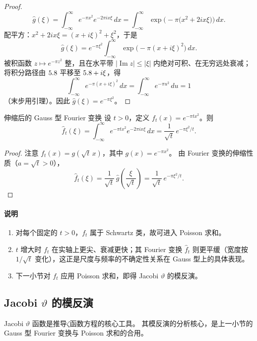\begin{proof}
\[
\hat{g}(\xi)
= \int_{-\infty}^{\infty} e^{-\pi x^2} e^{-2\pi i x\xi}\, dx
= \int_{-\infty}^{\infty} \exp\bigl(-\pi\bigl(x^2 + 2 i x\xi\bigr)\bigr)\, dx.
\]
配平方：$x^2+2ix\xi=(x+i\xi)^2+\xi^2$，于是
\[
\hat{g}(\xi)
= e^{-\pi\xi^2}
\int_{-\infty}^{\infty} \exp\bigl(-\pi (x+i\xi)^2\bigr)\, dx.
\]
被积函数 $z\mapsto e^{-\pi z^2}$ 整，且在水平带 $|\operatorname{Im} z|\le |\xi|$ 内绝对可积、在无穷远处衰减；
将积分路径由 $5.8$ 平移至 $5.8+i\xi$，得
\[
\int_{-\infty}^{\infty} e^{-\pi (x+i\xi)^2}\, dx
= \int_{-\infty}^{\infty} e^{-\pi u^2}\, du = 1
\]
（末步用引理）。因此 $\hat{g}(\xi)=e^{-\pi\xi^2}$。
\end{proof}

\begin{theorem}{伸缩后的 Gauss 型 Fourier 变换}{}\label{thm:gaussian_ft_scaled}
设 $t>0$，定义 $f_t(x)=e^{-\pi t x^2}$。则
\[
\hat{f}_t(\xi)
= \int_{-\infty}^{\infty} e^{-\pi t x^2} e^{-2\pi i x\xi}\, dx
= \frac{1}{\sqrt{t}}\, e^{-\pi \xi^2 / t}.
\]
\end{theorem}

\begin{proof}
注意 $f_t(x)=g(\sqrt{t}\, x)$，其中 $g(x)=e^{-\pi x^2}$。
由 Fourier 变换的伸缩性质（$a=\sqrt{t}>0$），
\[
\hat{f}_t(\xi)
= \frac{1}{\sqrt{t}}\, \hat{g}\!\left(\frac{\xi}{\sqrt{t}}\right)
= \frac{1}{\sqrt{t}}\, e^{-\pi \xi^2 / t}.
\]
\end{proof}

\paragraph{说明}
\begin{enumerate}
  \item 对每个固定的 $t>0$，$f_t$ 属于 Schwartz 类，故可进入 Poisson 求和。
  \item $t$ 增大时 $f_t$ 在实轴上更尖、衰减更快；其 Fourier 变换 $\hat{f}_t$ 则更平缓（宽度按 $1/\sqrt{t}$ 变化），这正是尺度与频率的不确定性关系在 Gauss 型上的具体表现。
  \item 下一小节对 $f_t$ 应用 Poisson 求和，即得 Jacobi $\vartheta$ 的模反演。
\end{enumerate}

\subsection{Jacobi \texorpdfstring{$\vartheta$}{theta} 的模反演}

Jacobi $\vartheta$ 函数是推导$\zeta$函数方程的核心工具。
其模反演的分析核心，是上一小节的 Gauss 型 Fourier 变换与 Poisson 求和的合用。

